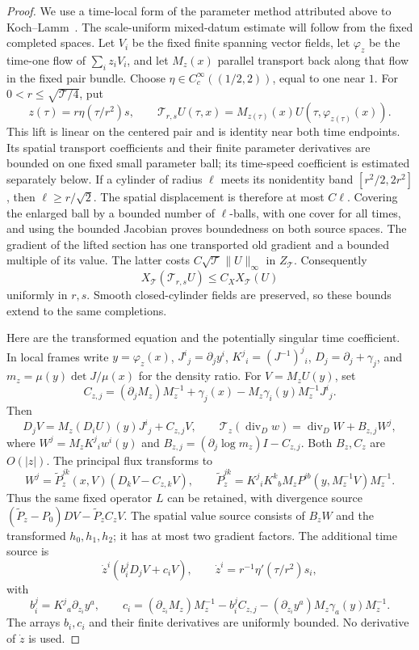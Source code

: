 \documentclass[11pt]{article}
\numberwithin{equation}{section}
\theoremstyle{definition}
\theoremstyle{remark}
\begin{document}
\begin{proof}
We use a time-local form of the parameter method attributed
above to Koch--Lamm~\cite[Sections 2--4 of the inspected
preprint]{KochLamm2015}. The scale-uniform mixed-datum
estimate will follow from the fixed completed spaces.
Let \(V_i\) be the fixed finite spanning vector fields, let
\(\varphi_z\) be the time-one flow of \(\sum_i z_iV_i\),
and let \(M_z(x)\) parallel transport back along that flow
in the fixed pair bundle. Choose
\(\eta\in C_c^\infty((1/2,2))\), equal to one near \(1\).
For \(0<r\le\sqrt{\mathcal T/4}\), put
\[
 z(\tau)=r\eta(\tau/r^2)s,\qquad
 \mathcal T_{r,s}U(\tau,x)
   =M_{z(\tau)}(x)U(\tau,\varphi_{z(\tau)}(x)).
\]
This lift is linear on the centered pair and is identity near
both time endpoints. Its spatial transport coefficients and
their finite parameter derivatives are bounded on one fixed
small parameter ball; its time-speed coefficient is estimated
separately below. If a cylinder of radius \(\ell\) meets
its nonidentity band \([r^2/2,2r^2]\), then
\(\ell\ge r/\sqrt2\). The spatial displacement is therefore
at most \(C\ell\). Covering the enlarged ball by a bounded
number of \(\ell\)-balls, with one cover for all times,
and using the bounded Jacobian proves boundedness on
both source spaces. The gradient of the lifted section
has one transported old gradient and a bounded multiple
of its value. The latter costs
\(C\sqrt{\mathcal T}\|U\|_\infty\) in \(Z_{\mathcal T}\).
Consequently
\[
 X_{\mathcal T}(\mathcal T_{r,s}U)
       \le C_X X_{\mathcal T}(U)
\]
uniformly in \(r,s\). Smooth closed-cylinder fields are
preserved, so these bounds extend to the same completions.

Here are the transformed equation and the potentially singular
time coefficient. In local frames write
\(y=\varphi_z(x)\), \(J^i{}_j=\partial_jy^i\),
\(K^j{}_i=(J^{-1})^j{}_i\), \(D_j=\partial_j+\gamma_j\),
and \(m_z=\mu(y)\det J/\mu(x)\) for the density ratio.
For \(V=M_zU(y)\), set
\[
 C_{z,j}=(\partial_jM_z)M_z^{-1}+\gamma_j(x)
                -M_z\gamma_i(y)M_z^{-1}J^i{}_j .
\]
Then
\[
 D_jV=M_z(D_iU)(y)J^i{}_j+C_{z,j}V,\qquad
 \mathcal T_z(\operatorname{div}_D w)
 =\operatorname{div}_D W+B_{z,j}W^j,
\]
where \(W^j=M_zK^j{}_iw^i(y)\) and
\(B_{z,j}=(\partial_j\log m_z)I-C_{z,j}\).
Both \(B_z,C_z\) are \(O(|z|)\).
The principal flux transforms to
\[
 W^j=\widetilde P_z^{jk}(x,V)(D_kV-C_{z,k}V),\qquad
 \widetilde P_z^{jk}
 =K^j{}_iK^k{}_b M_zP^{ib}(y,M_z^{-1}V)M_z^{-1}.
\]
Thus the same fixed operator \(L\) can be retained, with
divergence source
\((\widetilde P_z-P_0)DV-\widetilde P_zC_zV\).
The spatial value source consists of \(B_zW\) and the
transformed \(h_0,h_1,h_2\); it has at most two gradient
factors. The additional time source is
\[
 \dot z^i(b_i^jD_jV+c_iV),\qquad
 \dot z^i=r^{-1}\eta'(\tau/r^2)s_i,
\]
with
\[
 b_i^j=K^j{}_a\partial_{z_i}y^a,\qquad
 c_i=(\partial_{z_i}M_z)M_z^{-1}
       -b_i^jC_{z,j}
       -(\partial_{z_i}y^a)M_z\gamma_a(y)M_z^{-1}.
\]
The arrays \(b_i,c_i\) and their finite derivatives are
uniformly bounded. No derivative of \(\dot z\) is used.


\end{proof}
\end{document}
